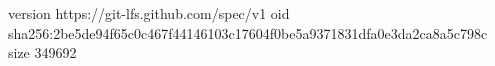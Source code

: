 version https://git-lfs.github.com/spec/v1
oid sha256:2be5de94f65c0c467f44146103c17604f0be5a9371831dfa0e3da2ca8a5c798c
size 349692
